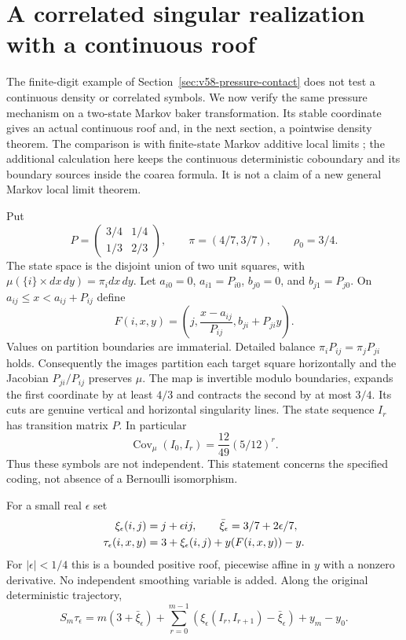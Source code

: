 \section{A correlated singular realization with a continuous roof}
\label{sec:v59-markov-realization}
The finite-digit example of Section~\ref{sec:v58-pressure-contact}
does not test a continuous density or correlated symbols. We now verify
the same pressure mechanism on a two-state Markov baker transformation.
Its stable coordinate gives an actual continuous roof and, in the next
section, a pointwise density theorem. The comparison is with finite-state
Markov additive local limits \cite{HL}; the additional calculation here
keeps the continuous deterministic coboundary and its boundary sources
inside the coarea formula. It is not a claim of a new general Markov
local limit theorem.

Put
\begin{equation}\label{eq:v59-markov-data}
 P=\begin{pmatrix}3/4&1/4\\1/3&2/3\end{pmatrix},\qquad
 \pi=(4/7,3/7),\qquad \rho_0=3/4.
\end{equation}
The state space is the disjoint union of two unit squares, with
$\mu(\{i\}\times dx\,dy)=\pi_i dx\,dy$. Let
$a_{i0}=0$, $a_{i1}=P_{i0}$, $b_{j0}=0$, and $b_{j1}=P_{j0}$.
On $a_{ij}\le x<a_{ij}+P_{ij}$ define
\begin{equation}\label{eq:v59-markov-baker}
 F(i,x,y)=\left(j,\frac{x-a_{ij}}{P_{ij}},b_{ji}+P_{ji}y\right).
\end{equation}
Values on partition boundaries are immaterial. Detailed balance
$\pi_iP_{ij}=\pi_jP_{ji}$ holds. Consequently the images partition each
target square horizontally and the Jacobian $P_{ji}/P_{ij}$ preserves
$\mu$. The map is invertible modulo boundaries, expands the first
coordinate by at least $4/3$ and contracts the second by at most $3/4$.
Its cuts are genuine vertical and horizontal singularity lines.
The state sequence $I_r$ has transition matrix $P$. In particular
\begin{equation}\label{eq:v59-nonindependence}
 \operatorname{Cov}_\mu(I_0,I_r)=\frac{12}{49}(5/12)^r.
\end{equation}
Thus these symbols are not independent. This statement concerns the
specified coding, not absence of a Bernoulli isomorphism.

For a small real $\epsilon$ set
\begin{align}
 \xi_\epsilon(i,j)&=j+\epsilon ij,\qquad
 \bar\xi_\epsilon=3/7+2\epsilon/7,\notag\\
 \tau_\epsilon(i,x,y)&=3+\xi_\epsilon(i,j)+y(F(i,x,y))-y.
                                             \label{eq:v59-continuous-roof}
\end{align}
For $|\epsilon|<1/4$ this is a bounded positive roof, piecewise affine
in $y$ with a nonzero derivative. No independent smoothing variable is
added. Along the original deterministic trajectory,
\begin{equation}\label{eq:v59-roof-telescoping}
 S_m\tau_\epsilon=m(3+\bar\xi_\epsilon)
 +\sum_{r=0}^{m-1}(\xi_\epsilon(I_r,I_{r+1})-\bar\xi_\epsilon)
 +y_m-y_0.
\end{equation}

